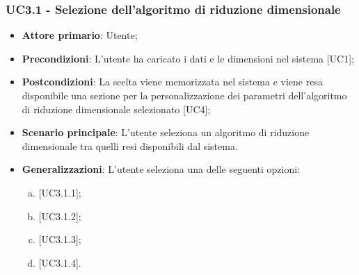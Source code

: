 \subsubsection{UC3.1 - Selezione dell'algoritmo di riduzione dimensionale}
\begin{itemize}
	\item \textbf{Attore primario}: Utente;
	\item \textbf{Precondizioni}: L'utente ha caricato i dati e le dimensioni nel sistema [UC1];
	\item \textbf{Postcondizioni}: La scelta viene memorizzata nel sistema e viene resa disponibile una sezione per la personalizzazione dei parametri dell'algoritmo di riduzione dimensionale selezionato [UC4];
	\item \textbf{Scenario principale}: L'utente seleziona un algoritmo di riduzione dimensionale tra quelli resi disponibili dal sistema.
	\item \textbf{Generalizzazioni}: L'utente seleziona una delle seguenti opzioni:
	\begin{enumerate}[(a)]
		\item {} [UC3.1.1];
		\item {} [UC3.1.2];
		\item {} [UC3.1.3];
		\item {} [UC3.1.4].
	\end{enumerate}
\end{itemize}
